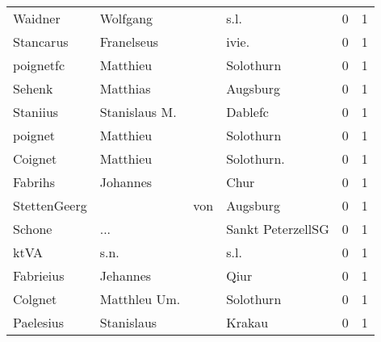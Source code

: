\begin{center}
\begin{tiny}
\begin{longtabu}{llllrr}
                  Waidner &                           Wolfgang &             &                                        s.l. &          0 &         1 \\
                Stancarus &                         Franelseus &             &                                      ivie.  &          0 &         1 \\
                poignetfc &                           Matthieu &             &                                   Solothurn &          0 &         1 \\
                   Sehenk &                           Matthias &             &                                    Augsburg &          0 &         1 \\
                 Staniius &                      Stanislaus M. &             &                                     Dablefc &          0 &         1 \\
                  poignet &                           Matthieu &             &                                   Solothurn &          0 &         1 \\
                  Coignet &                           Matthieu &             &                                 Solothurn.  &          0 &         1 \\
                  Fabrihs &                           Johannes &             &                                        Chur &          0 &         1 \\
             StettenGeerg &                                    &         von &                                    Augsburg &          0 &         1 \\
                   Schone &                                ... &             &                           Sankt PeterzellSG &          0 &         1 \\
                     ktVA &                               s.n. &             &                                        s.l. &          0 &         1 \\
                Fabrieius &                           Jehannes &             &                                        Qiur &          0 &         1 \\
                  Colgnet &                       Matthleu Um. &             &                                   Solothurn &          0 &         1 \\
                Paelesius &                         Stanislaus &             &                                      Krakau &          0 &         1 \\

\end{longtabu}
\end{tiny}
\end{center}
